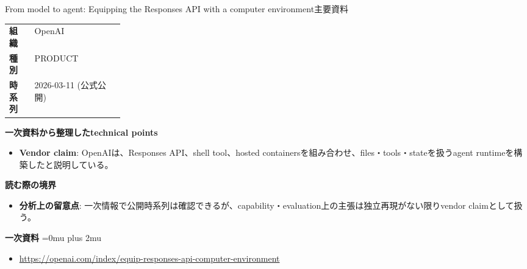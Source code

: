 \begin{technicalnote}{From model to agent: Equipping the Responses API with a computer environment}{主要資料}
\begingroup
\begin{tabularx}{\linewidth}{@{}>{\bfseries}p{0.22\linewidth}X@{}}
組織 & OpenAI \\
種別 & PRODUCT \\
時系列 & 2026-03-11 (公式公開) \\
\end{tabularx}
\smallskip
{\bfseries 一次資料から整理したtechnical points}
\begin{itemize}[leftmargin=1.5em,itemsep=0.35em]
\item \textbf{Vendor claim}: OpenAIは、Responses API、shell tool、hosted containersを組み合わせ、files・tools・stateを扱うagent runtimeを構築したと説明している。
\end{itemize}
\begin{minipage}{\linewidth}
{\bfseries 読む際の境界}
\begin{itemize}[leftmargin=1.5em,itemsep=0.35em]
\item \textbf{分析上の留意点}: 一次情報で公開時系列は確認できるが、capability・evaluation上の主張は独立再現がない限りvendor claimとして扱う。
\end{itemize}
\begin{samepage}
{\bfseries 一次資料}
\begingroup\sloppy
\Urlmuskip=0mu plus 2mu\relax
\begin{itemize}[leftmargin=1.5em,itemsep=0.25em]
\item {\scriptsize\url{https://openai.com/index/equip-responses-api-computer-environment}}
\end{itemize}
\endgroup
\end{samepage}
\end{minipage}
\endgroup
\end{technicalnote}
\medskip

